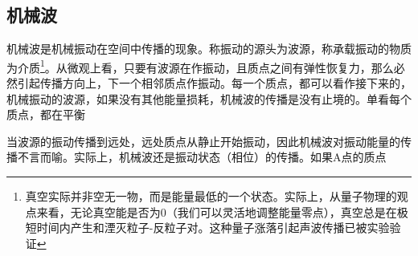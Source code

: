 
\subsection{机械波}
机械波是机械振动在空间中传播的现象。称振动的源头为波源，称承载振动的物质为介质\footnote{真空实际并非空无一物，而是能量最低的一个状态。实际上，从量子物理的观点来看，无论真空能是否为0（我们可以灵活地调整能量零点），真空总是在极短时间内产生和湮灭粒子-反粒子对。这种量子涨落引起声波传播已被实验验证}。从微观上看，只要有波源在作振动，且质点之间有弹性恢复力，那么必然引起传播方向上，下一个相邻质点作振动。每一个质点，都可以看作接下来的，机械振动的波源，如果没有其他能量损耗，机械波的传播是没有止境的。单看每个质点，都在平衡

当波源的振动传播到远处，远处质点从静止开始振动，因此机械波对振动能量的传播不言而喻。实际上，机械波还是振动状态（相位）的传播。如果A点的质点
